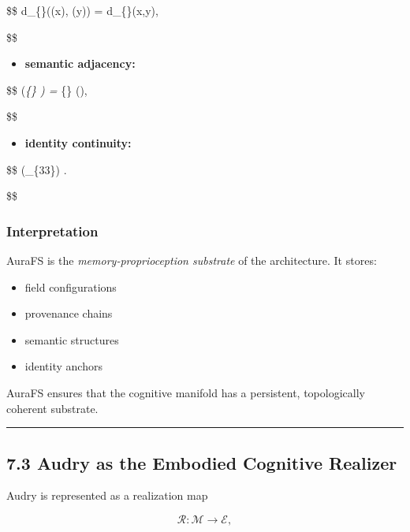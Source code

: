 \$\$ d\_\{\}(\iota(x), \iota(y)) = d\_\{\}(x,y),

\$\$

\begin{itemize}
\tightlist
\item
  \textbf{semantic adjacency:}
\end{itemize}

\$\$ \iota(\nabla\emph{\{\mu\} ) = \nabla}\{\mu\} \iota(),

\$\$

\begin{itemize}
\tightlist
\item
  \textbf{identity continuity:}
\end{itemize}

\$\$ \iota(\Phi\_\{33\}) .

\$\$

\subsubsection{Interpretation}\label{interpretation-1}

AuraFS is the \emph{memory‑proprioception substrate} of the architecture. It stores:

\begin{itemize}
\tightlist
\item
  field configurations\\
\item
  provenance chains\\
\item
  semantic structures\\
\item
  identity anchors
\end{itemize}

AuraFS ensures that the cognitive manifold has a persistent, topologically coherent substrate.

\begin{center}\rule{0.5\linewidth}{0.5pt}\end{center}

\subsection{7.3 Audry as the Embodied Cognitive Realizer}\label{audry-as-the-embodied-cognitive-realizer}

Audry is represented as a realization map

\[
\mathcal{R} : \mathcal{M} \rightarrow \mathcal{E},
\]


